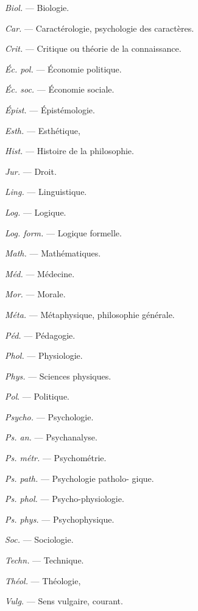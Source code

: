 \vspace{0.211cm}
\hfill
\begin{minipage}[c]{.45\linewidth}
\textsf{\textit {Biol.}} — Biologie.

\textsf{\textit {Car.}} — Caractérologie, psychologie
des caractères.

\textsf{\textit {Crit.}} — Critique ou théorie de la
connaissance.

\textsf{\textit {Éc. pol.}} — Économie politique.

\textsf{\textit {Éc. soc.}} — Économie sociale.

\textsf{\textit {Épist.}} — Épistémologie.

\textsf{\textit {Esth.}} — Esthétique,

\textsf{\textit {Hist.}} — Histoire de la philosophie.

\textsf{\textit {Jur.}} — Droit.

\textsf{\textit {Ling.}} — Linguistique.

\textsf{\textit {Log.}} — Logique.

\textsf{\textit {Log. form.}} — Logique formelle.

\textsf{\textit {Math.}} — Mathématiques.

\textsf{\textit {Méd.}} — Médecine.

\textsf{\textit {Mor.}} — Morale.
\end{minipage}
\hfill
\begin{minipage}[c]{.45\linewidth}
\textsf{\textit {Méta.}} — Métaphysique, philosophie
générale.

\textsf{\textit {Péd.}} — Pédagogie.

\textsf{\textit {Phol.}} — Physiologie.

\textsf{\textit {Phys.}} — Sciences physiques.

\textsf{\textit {Pol}}. — Politique.

\textsf{\textit {Psycho.}} — Psychologie.

\textsf{\textit {Ps. an.}} — Psychanalyse.

\textsf{\textit {Ps. métr.}} — Psychométrie.

\textsf{\textit {Ps. path.}} — Psychologie patholo-
gique.

\textsf{\textit {Ps. phol.}} — Psycho-physiologie.

\textsf{\textit {Ps. phys.}} — Psychophysique.

\textsf{\textit {Soc.}} — Sociologie.

\textsf{\textit {Techn.}} — Technique.

\textsf{\textit {Théol.}} — Théologie,

\textsf{\textit {Vulg.}} — Sens vulgaire, courant.
\end{minipage}


